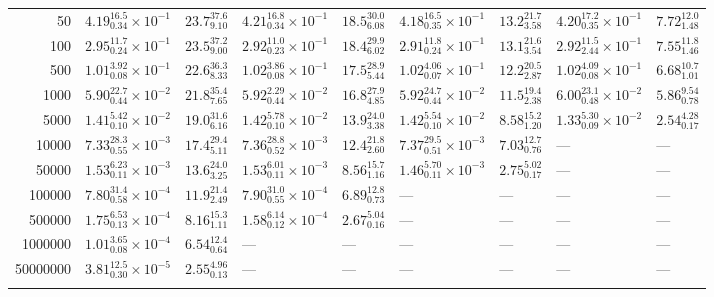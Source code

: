 \begin{table*}
\begin{tabular}{r|ll|ll|ll|ll}
    \rule{0pt}{2.6ex}\num{50}       & $4.19_{0.34}^{16.5}\times 10^{-1}$ & $23.7_{9.10}^{37.6}$ & $4.21_{0.34}^{16.8}\times 10^{-1}$ & $18.5_{6.08}^{30.0}$ & $4.18_{0.35}^{16.5}\times 10^{-1}$ & $13.2_{3.58}^{21.7}$ & $4.20_{0.35}^{17.2}\times 10^{-1}$ & $7.72_{1.48}^{12.0}$ \\
    \rule{0pt}{2.6ex}\num{100}      & $2.95_{0.24}^{11.7}\times 10^{-1}$ & $23.5_{9.00}^{37.2}$ & $2.92_{0.23}^{11.0}\times 10^{-1}$ & $18.4_{6.02}^{29.9}$ & $2.91_{0.24}^{11.8}\times 10^{-1}$ & $13.1_{3.54}^{21.6}$ & $2.92_{2.44}^{11.5}\times 10^{-1}$ & $7.55_{1.46}^{11.8}$ \\
    \rule{0pt}{2.6ex}\num{500}      & $1.01_{0.08}^{3.92}\times 10^{-1}$ & $22.6_{8.33}^{36.3}$ & $1.02_{0.08}^{3.86}\times 10^{-1}$ & $17.5_{5.44}^{28.9}$ & $1.02_{0.07}^{4.06}\times 10^{-1}$ & $12.2_{2.87}^{20.5}$ & $1.02_{0.08}^{4.09}\times 10^{-1}$ & $6.68_{1.01}^{10.7}$ \\
    \rule{0pt}{2.6ex}\num{1000}     & $5.90_{0.44}^{22.7}\times 10^{-2}$ & $21.8_{7.65}^{35.4}$ & $5.92_{0.44}^{2.29}\times 10^{-2}$ & $16.8_{4.85}^{27.9}$ & $5.92_{0.44}^{24.7}\times 10^{-2}$ & $11.5_{2.38}^{19.4}$ & $6.00_{0.48}^{23.1}\times 10^{-2}$ & $5.86_{0.78}^{9.54}$ \\
    \rule{0pt}{2.6ex}\num{5000}     & $1.41_{0.10}^{5.42}\times 10^{-2}$ & $19.0_{6.16}^{31.6}$ & $1.42_{0.10}^{5.78}\times 10^{-2}$ & $13.9_{3.38}^{24.0}$ & $1.42_{0.10}^{5.54}\times 10^{-2}$ & $8.58_{1.20}^{15.2}$ & $1.33_{0.09}^{5.30}\times 10^{-2}$ & $2.54_{0.17}^{4.28}$ \\
    \rule{0pt}{2.6ex}\num{10000}    & $7.33_{0.55}^{28.3}\times 10^{-3}$ & $17.4_{5.11}^{29.4}$ & $7.36_{0.52}^{28.8}\times 10^{-3}$ & $12.4_{2.60}^{21.8}$ & $7.37_{0.51}^{29.5}\times 10^{-3}$ & $7.03_{0.76}^{12.7}$ & --- & --- \\
    \rule{0pt}{2.6ex}\num{50000}    & $1.53_{0.11}^{6.23}\times 10^{-3}$ & $13.6_{3.25}^{24.0}$ & $1.53_{0.11}^{6.01}\times 10^{-3}$ & $8.56_{1.16}^{15.7}$ & $1.46_{0.11}^{5.70}\times 10^{-3}$ & $2.75_{0.17}^{5.02}$ & --- & --- \\
    \rule{0pt}{2.6ex}\num{100000}   & $7.80_{0.58}^{31.4}\times 10^{-4}$ & $11.9_{2.49}^{21.4}$ & $7.90_{0.55}^{31.0}\times 10^{-4}$ & $6.89_{0.73}^{12.8}$ & --- & --- & --- & --- \\
    \rule{0pt}{2.6ex}\num{500000}   & $1.75_{0.13}^{6.53}\times 10^{-4}$ & $8.16_{1.11}^{15.3}$ & $1.58_{0.12}^{6.14}\times 10^{-4}$ & $2.67_{0.16}^{5.04}$ & --- & --- & --- & --- \\
    \rule{0pt}{2.6ex}\num{1000000}  & $1.01_{0.08}^{3.65}\times 10^{-4}$ & $6.54_{0.64}^{12.4}$ & --- & --- & --- & --- & --- & --- \\
    \rule{0pt}{2.6ex}\num{50000000} & $3.81_{0.30}^{12.5}\times 10^{-5}$ & $2.55_{0.13}^{4.96}$ & --- & --- & --- & --- & --- & --- \\
    \noalign{\smallskip}\hline
    \end{tabular}
    \end{table*}

\printbibliography




